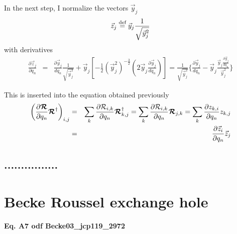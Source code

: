 \documentclass[11pt,a4paper]{report}
\begin{document}
In the next step, I normalize the vectors $\vec{y}_j$
\begin{eqnarray}
\vec{z}_j\stackrel{\text{def}}{=}\vec{y}_j\frac{1}{\sqrt{\vec{y}_j^2}}
\end{eqnarray}
with derivatives
\begin{eqnarray}
\frac{\partial\vec{z}_j}{\partial q_n}
&=&
\frac{\partial\vec{y}_j}{dq_n}\frac{1}{\sqrt{\vec{y}_j^2}}
+
\vec{y}_j\left[-\frac{1}{2}(\vec{y}_j^2)^{-\frac{3}{2}}
\left(2\vec{y}_j\frac{\partial\vec{y}_j}{dq_n}\right)\right]
%
%
=
\frac{1}{\sqrt{\vec{y}_j^2}}
\biggl\{
\frac{\partial\vec{y}_j}{dq_n}
-
\vec{y}_j\frac{\vec{y}_j\frac{\partial\vec{y}_j}{dq_n}}{\vec{y}_j^2}
\biggr\}
\end{eqnarray}

This is inserted into the equation obtained previously
\begin{eqnarray}
\left(
\frac{\partial\bm{\mathcal{R}}}{\partial q_n}\bm{\mathcal{R}}^\dagger
\right)_{i,j}
&=&
\sum_k
\frac{\partial\mathcal{R}_{i,k}}{\partial q_n}\bm{\mathcal{R}}^\dagger_{k,j}
=
\sum_k
\frac{\partial\mathcal{R}_{i,k}}{\partial q_n}\bm{\mathcal{R}}_{j,k}
=
\sum_k
\frac{\partial{z}_{k,i}}{\partial q_n}z_{k,j}
\nonumber\\
&=&
\frac{\partial\vec{z}_i}{\partial q_n}\vec{z}_{j}
\nonumber\\
\end{eqnarray}


\section{................}



\appendix
\chapter{Becke Roussel exchange hole}

\subsubsection{Eq. A7 odf Becke03\_jcp119\_2972}
\end{document}
